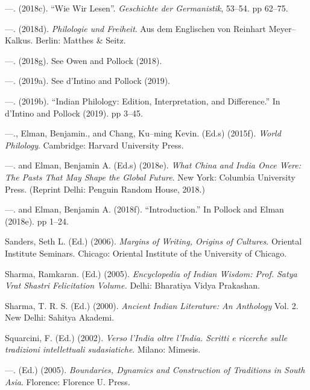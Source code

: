 \begin{thebibliography}{99}
 \item —. (2018c). “Wie Wir Lesen”. \textit{Geschichte der Germanistik}, 53–54. pp 62–75.

 \item —. (2018d). \textit{Philologie und Freiheit}. Aus dem Englischen von Reinhart Meyer–Kalkus. Berlin: Matthes \& Seitz.

 \item —. (2018g). See Owen and Pollock (2018).

 \item —. (2019a). See d’Intino and Pollock (2019).

 \item —. (2019b). “Indian Philology: Edition, Interpretation, and Difference.” In d’Intino and Pollock (2019). pp 3–45.

 \item —., Elman, Benjamin., and Chang, Ku–ming Kevin. (Ed.s) (2015f).\textit{ World Philology}. Cambridge: Harvard University Press.

 \item —. and Elman, Benjamin A. (Ed.s) (2018e). \textit{What China and India Once Were: The Pasts That May Shape the Global Future}. New York: Columbia University Press. (Reprint Delhi: Penguin Random House, 2018.)

 \item —. and Elman, Benjamin A. (2018f). “Introduction.” In Pollock and Elman (2018e). pp 1–24.

 \item Sanders, Seth L. (Ed.) (2006). \textit{Margins of Writing, Origins of Cultures}. Oriental Institute Seminars. Chicago: Oriental Institute of the University of Chicago.

 \item Sharma, Ramkaran. (Ed.) (2005). \textit{Encyclopedia of Indian Wisdom: Prof. Satya Vrat Shastri Felicitation Volume.} Delhi: Bharatiya Vidya Prakashan.

 \item Sharma, T. R. S. (Ed.) (2000). \textit{Ancient Indian Literature: An Anthology} Vol. 2. New Delhi: Sahitya Akademi.

 \item Squarcini, F. (Ed.) (2002). \textit{Verso l’India oltre l’India. Scritti e ricerche sulle tradizioni intellettuali sudasiatiche}. Milano: Mimesis.

 \item —. (Ed.) (2005). \textit{Boundaries, Dynamics and Construction of Traditions in South Asia}. Florence: Florence U. Press.


\end{thebibliography}

